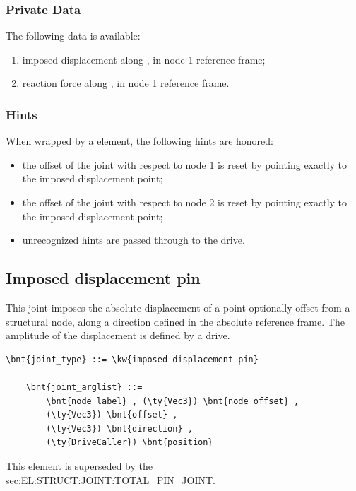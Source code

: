 \subsubsection{Private Data}
The following data is available:
\begin{enumerate}
\item {} imposed displacement along ,
in node 1 reference frame;
\item {} reaction force along ,
in node 1 reference frame.
\end{enumerate}

\subsubsection{Hints}
When wrapped by a  element, the following hints are honored:
\begin{itemize}
\item {} the offset of the joint
with respect to node 1 is reset by pointing exactly
to the imposed displacement point;
\item {} the offset of the joint
with respect to node 2 is reset by pointing exactly
to the imposed displacement point;
\item unrecognized hints are passed through to the drive.
\end{itemize}



\subsection{Imposed displacement pin}
\label{sec:EL:JOINT:IMPOSEDDISPLACEMENTPIN}
This joint imposes the absolute displacement of a point optionally offset
from a structural node, along a direction defined
in the absolute reference frame.
The amplitude of the displacement is defined by a drive.
\begin{Verbatim}[commandchars=\\\{\}]
    \bnt{joint_type} ::= \kw{imposed displacement pin}

    \bnt{joint_arglist} ::= 
        \bnt{node_label} , (\ty{Vec3}) \bnt{node_offset} ,
        (\ty{Vec3}) \bnt{offset} ,
        (\ty{Vec3}) \bnt{direction} ,
        (\ty{DriveCaller}) \bnt{position}
\end{Verbatim}
This element is superseded by the
\hyperref{\kw{total pin joint}}{\kw{total pin joint}, see Section~}{}{sec:EL:STRUCT:JOINT:TOTAL_PIN_JOINT}.

